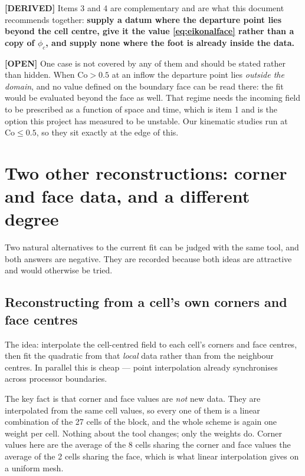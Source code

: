 \documentclass[11pt,a4paper]{article}
\newcommand{\derived}{\textcolor{blue!50!black}{\textbf{[DERIVED]}}}
\newcommand{\opn}{\textcolor{orange!80!black}{\textbf{[OPEN]}}}
\begin{document}
\derived{} Items 3 and 4 are complementary and are what this document recommends together:
\textbf{supply a datum where the departure point lies beyond the cell centre, give it the value
\eqref{eq:eikonalface} rather than a copy of \(\phi_c\), and supply none where the foot is
already inside the data.}

\opn{} One case is not covered by any of them and should be stated rather than hidden. When
\(\mathrm{Co} > 0.5\) at an inflow the departure point lies \emph{outside the domain}, and no
value defined on the boundary face can be read there: the fit would be evaluated beyond the face
as well. That regime needs the incoming field to be prescribed as a function of space and time,
which is item 1 and is the option this project has measured to be unstable. Our kinematic
studies run at \(\mathrm{Co} \le 0.5\), so they sit exactly at the edge of this.

\section{Two other reconstructions: corner and face data, and a different degree}
\label{sec:otherrecon}

Two natural alternatives to the current fit can be judged with the same tool, and both answers
are negative. They are recorded because both ideas are attractive and would otherwise be tried.

\subsection{Reconstructing from a cell's own corners and face centres}

The idea: interpolate the cell-centred field to each cell's corners and face centres, then fit
the quadratic from that \emph{local} data rather than from the neighbour centres. In parallel
this is cheap --- point interpolation already synchronises across processor boundaries.

The key fact is that corner and face values are \emph{not} new data. They are interpolated from
the same cell values, so every one of them is a linear combination of the 27 cells of the block,
and the whole scheme is again one weight per cell. Nothing about the tool changes; only the
weights do. Corner values here are the average of the 8 cells sharing the corner and face values
the average of the 2 cells sharing the face, which is what linear interpolation gives on a
uniform mesh.
\end{document}
